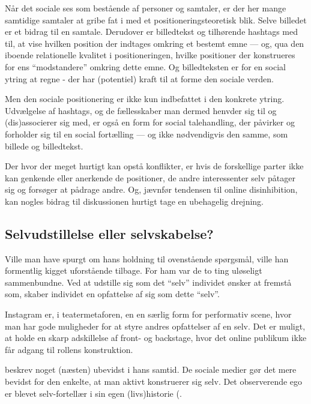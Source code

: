 Når det sociale ses som bestående af personer og samtaler, er der 
her mange samtidige samtaler at gribe fat i med et 
positioneringsteoretisk blik. Selve billedet er et bidrag til en 
samtale. Derudover er billedtekst og tilhørende hashtags med til, 
at vise hvilken position der indtages omkring et bestemt emne — 
og, qua den iboende relationelle kvalitet i positioneringen, 
hvilke positioner der konstrueres for ens “modstandere” omkring 
dette emne. Og billedteksten er for en social ytring at regne - 
der har (potentiel) kraft til at forme den sociale verden.

Men den sociale positionering er ikke kun indbefattet i den 
konkrete ytring. Udvælgelse af hashtags, og de fællesskaber man 
dermed henvder sig til og (dis)associerer sig med, er også en form 
for social talehandling, der påvirker og forholder sig til en 
social fortælling — og ikke nødvendigvis den samme, som billede og 
billedtekst.

Der hvor der meget hurtigt kan opstå konflikter, er hvis de 
forskellige parter ikke kan genkende eller anerkende de 
positioner, de andre interessenter selv påtager sig og forsøger at 
pådrage andre. Og, jævnfør tendensen til online disinhibition, kan 
nogles bidrag til diskussionen hurtigt tage en ubehagelig 
drejning.


\subsection{Selvudstillelse eller selvskabelse?}

Ville man have spurgt 
\citeauthor{goffmanPresentationSelfEveryday1956} om hans holdning 
til ovenstående spørgsmål, ville han formentlig kigget uforstående 
tilbage. For ham var de to ting uløseligt sammenbundne. Ved at 
udstille sig som det “selv” individet ønsker at fremstå som, 
skaber individet en opfattelse af sig som dette “selv”.

Instagram er, i teatermetaforen, en en særlig form for performativ 
scene, hvor man har gode muligheder for at styre andres 
opfattelser af en selv. Det er muligt, at holde en skarp 
adskillelse af front- og backstage, hvor det online publikum ikke 
får adgang til rollens konstruktion.

\citeauthor{goffmanPresentationSelfEveryday1956} beskrev noget 
(næsten) ubevidst i hans samtid. De sociale medier gør det mere 
bevidst for den enkelte, at man aktivt konstruerer sig selv.
Det observerende ego er blevet selv-fortellær i sin egen 
(livs)historie (\autocite{sulerSelfPortraitsSelfies2015}.

